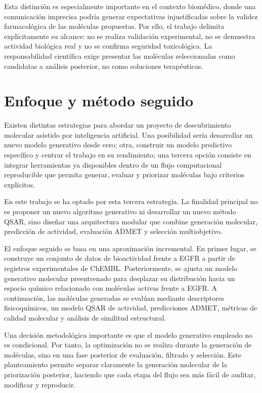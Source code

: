\documentclass[IB]{TFUOC}%
\begin{document}
Esta distinción es especialmente importante en el contexto biomédico, donde una comunicación imprecisa podría generar expectativas injustificadas sobre la validez farmacológica de las moléculas propuestas. Por ello, el trabajo delimita explícitamente su alcance: no se realiza validación experimental, no se demuestra actividad biológica real y no se confirma seguridad toxicológica. La responsabilidad científica exige presentar las moléculas seleccionadas como candidatas a análisis posterior, no como soluciones terapéuticas.

\section{Enfoque y método seguido}

Existen distintas estrategias para abordar un proyecto de descubrimiento molecular asistido por inteligencia artificial. Una posibilidad sería desarrollar un nuevo modelo generativo desde cero; otra, construir un modelo predictivo específico y centrar el trabajo en su rendimiento; una tercera opción consiste en integrar herramientas ya disponibles dentro de un flujo computacional reproducible que permita generar, evaluar y priorizar moléculas bajo criterios explícitos.

En este trabajo se ha optado por esta tercera estrategia. La finalidad principal no es proponer un nuevo algoritmo generativo ni desarrollar un nuevo método QSAR, sino diseñar una arquitectura modular que combine generación molecular, predicción de actividad, evaluación ADMET y selección multiobjetivo. 

El enfoque seguido se basa en una aproximación incremental. En primer lugar, se construye un conjunto de datos de bioactividad frente a EGFR a partir de registros experimentales de ChEMBL. Posteriormente, se ajusta un modelo generativo molecular preentrenado para desplazar su distribución hacia un espacio químico relacionado con moléculas activas frente a EGFR. A continuación, las moléculas generadas se evalúan mediante descriptores fisicoquímicos, un modelo QSAR de actividad, predicciones ADMET, métricas de calidad molecular y análisis de similitud estructural.

Una decisión metodológica importante es que el modelo generativo empleado no es condicional. Por tanto, la optimización no se realiza durante la generación de moléculas, sino en una fase posterior de evaluación, filtrado y selección. Este planteamiento permite separar claramente la generación molecular de la priorización posterior, haciendo que cada etapa del flujo sea más fácil de auditar, modificar y reproducir.
\end{document}
